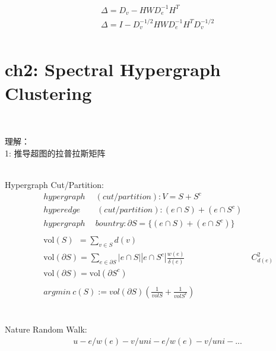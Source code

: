 \documentclass{article}
\begin{document}
%
\begin{align*}
    & \Delta = D_{v} - H W D_{e}^{-1} H^{T} \\[3pt]
    & \Delta = I - D_{v}^{-1/2} H W D_{e}^{-1} H^{T} D_{v}^{-1/2} \\[3pt]
\end{align*}


\newpage
\section*{ch2: Spectral Hypergraph Clustering}


~ \\[3pt]
\begin{CJK}{UTF8}{gbsn}
    理解： \\[3pt]
    1: 推导超图的拉普拉斯矩阵  \\[3pt]
\end{CJK}


~ \\[3pt]
%
Hypergraph Cut/Partition:  \\[3pt]
\begin{align*}
    & hypergraph \quad \ (cut/partition): V = S + S^{c}  \\[3pt]
    & hyperedge \qquad (cut/partition): (e \cap S) + (e \cap S^{c})  \\[3pt]
    & hypergraph \quad \ bountry: \partial S = \{ (e \cap S) + (e \cap S^{c}) \}  \\[3pt]
    ~ \\[3pt]
    & \text{vol}(S) \ \ = \sum_{v \in S} d(v)  \\[3pt]
    & \text{vol}(\partial S) = \sum_{e \in \partial S} 
      |e \cap S||e \cap S^{c}| \frac{w(e)}{\delta (e)} 
      \qquad \qquad \qquad \qquad C_{d(e)}^{2}  \\[3pt]
    & \text{vol}(\partial S) = \text{vol}(\partial S^{c})  \\[3pt]
    ~ \\[3pt]
    & argmin \ c(S) := vol(\partial S) (\frac{1}{volS} + \frac{1}{volS^{c}})  \\[3pt]
\end{align*}


~ \\[3pt]
%
Nature Random Walk:  \\[3pt]
\begin{align*}
    & u-e/w(e)-v/uni-e/w(e)-v/uni-...
\end{align*}
\end{document}
